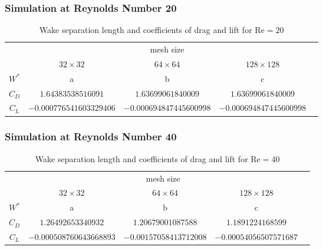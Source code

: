 	\subsubsection{Simulation at Reynolds Number 20}
	
		\begin{table}[htp]
			\centering
			\begin{tabular}{|c||c|c|c|c}
				\cline{1-4}
				\rule{0pt}{2,3ex}\multirow{2}{*}{}   & \multicolumn{3}{c|}{mesh size} &  \\ \cline{2-4}
				\rule{0pt}{2,3ex}& $32 \times 32$       & $64 \times 64$       & $128 \times 128$      &  \\ \cline{1-4}
				\rule{0pt}{2,3ex}$W^*$ 				 & a        & b        & c        &  \\ \cline{1-4}
				\rule{0pt}{2,3ex}$C_D$                & $1.64383538516091$        & $1.63699061840009$        & $1.63699061840009$       &  \\ \cline{1-4}
				\rule{0pt}{2,3ex}$C_L$                & $-0.000776541603329406$       & $-0.000694847445600998$       & $-0.000694847445600998$        &  \\ \cline{1-4}
			\end{tabular}
			\caption{Wake separation length and coefficients of drag and lift for $\text{Re}=20$}
			\label{tab:re20}
		\end{table}
	\subsubsection{Simulation at Reynolds Number 40}
		\begin{table}[htp]
			\centering
			\begin{tabular}{|c||c|c|c|c}
				\cline{1-4}
				\rule{0pt}{2,3ex}\multirow{2}{*}{}   & \multicolumn{3}{c|}{mesh size} &  \\ \cline{2-4}
				\rule{0pt}{2,3ex}& $32 \times 32$       & $64 \times 64$       & $128 \times 128$      &  \\ \cline{1-4}
				\rule{0pt}{2,3ex}$W^*$ 				 & a        & b        & c        &  \\ \cline{1-4}
				\rule{0pt}{2,3ex}$C_D$                & $1.26492653340932$        & $1.20679001087588$        & $1.1891224168599$       &  \\ \cline{1-4}
				\rule{0pt}{2,3ex}$C_L$                & $-0.000508760643668893$        & $-0.00157058413712008$        & $-0.00054056507571687$        &  \\ \cline{1-4}
			\end{tabular}
			\caption{Wake separation length and coefficients of drag and lift for $\text{Re}=40$}
			\label{tab:re40}
		\end{table}
